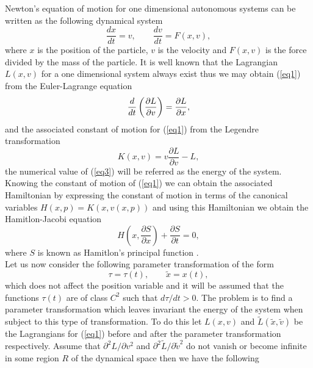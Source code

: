 Newton's equation of motion for one dimensional autonomous systems can be
written as the following dynamical system
\begin{equation}
\frac{dx}{dt}=v,\qquad \frac{dv}{dt}=F(x,v),  \label{eq1}
\end{equation}%
where $x$ is the position of the particle, $v$ is the velocity and
$F(x,v)$ is the force divided by the mass of the particle. It is
well known that the Lagrangian $L(x,v)$ for a one dimensional
system always exist \cite{D} thus we may obtain (\ref{eq1}) from
the Euler-Lagrange equation \cite{B1}
\begin{equation}
\frac{d}{dt}\left( \frac{\partial L}{\partial v}\right) =\frac{\partial L}{%
\partial x},  \label{eq2}
\end{equation}%
and the associated constant of motion for (\ref{eq1}) from the Legendre
transformation \cite{B1}
\begin{equation}
K(x,v)=v\frac{\partial L}{\partial v}-L,  \label{eq3}
\end{equation}%
the numerical value of (\ref{eq3}) will be referred as the energy
of the system. Knowing the constant of motion of (\ref{eq1}) we
can obtain the associated Hamiltonian by expressing the constant
of motion in terms of the canonical variables $H(x,p)=K(x,v(x,p))$
and using this Hamiltonian we obtain the Hamitlon-Jacobi equation
\begin{equation}
H\left(x,\frac{\partial S}{\partial x}\right)+\frac{\partial
S}{\partial t}=0, \label{eq3a}
\end{equation}
where $S$ is known as Hamitlon's principal function \cite{B1}.\\
Let us now consider the following parameter transformation of the
form
\begin{equation}
\tau =\tau (t),\qquad \tilde{x}=x(t),  \label{eq4}
\end{equation}
which does not affect the position variable and it will be assumed
that the functions $\tau (t)$ are of class $C^{2}$ such that
$d\tau /dt>0$. The problem is to find a parameter transformation
which leaves invariant the energy of the system when subject to
this type of transformation. To do this let $L(x,v)$ and
$\tilde{L}(\tilde{x},\tilde{v})$ be the Lagrangians for
(\ref{eq1}) before and after the parameter transformation
respectively. Assume that $\partial ^{2}L/\partial v^{2}$ and
$\partial ^{2}\tilde{L}/\partial \tilde{v}^{2}$ do not vanish or
become infinite in some region $R$ of the dynamical space then we
have the following

